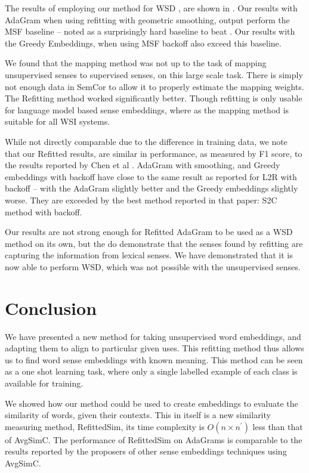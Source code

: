 \documentclass{sig-alternate}
\begin{document}
The results of employing our method for WSD , are shown in . Our results with AdaGram when using refitting with geometric smoothing, output perform the MSF baseline -- noted as a surprisingly hard baseline to beat \parencite{Chen2014}. Our results with the Greedy Embeddings, when using MSF backoff also exceed this baseline.

We found that the mapping method\parencite{agirre2006}  was not up to the task of mapping unsupervised senses to supervised senses, on this large scale task. There is simply not enough data in SemCor to allow it to properly estimate the mapping weights. The Refitting method worked significantly better. Though refitting is only usable for language model based sense embeddings, where as the mapping method is suitable for all WSI systems.

While not directly comparable due to the difference in training data, we note that our Refitted results, are similar in performance, as measured by F1 score, to the results reported by Chen et al \parencite{Chen2014}.
AdaGram with smoothing, and Greedy embeddings with backoff have close to the same result as reported for L2R with backoff -- with the AdaGram slightly better and the Greedy embeddings slightly worse. They are exceeded by the best method reported in that paper: S2C method with backoff.

Our results are not strong enough for Refitted AdaGram to be used as a WSD method on its own, but the do demonstrate that the senses found by refitting are capturing the information from lexical senses. We have demonstrated that it is now able to perform WSD, which was not possible with the unsupervised senses. 

\section{Conclusion}\label{conclusion}

We have presented a new method for taking unsupervised word embeddings, and adapting them to align to particular given uses. This refitting method thus allows us to find word sense embeddings with known meaning. This method can be seen as a one shot learning task, where only a single labelled example of each class is available for training.

We showed how our method could be used to create embeddings to evaluate the similarity of words, given their contexts. This in itself is a new similarity measuring method, RefittedSim, its time complexity is $O(n \times n^\prime)$ less than that of AvgSimC. The performance of RefittedSim on AdaGrams is comparable to the results reported by the proposers of other sense embeddings techniques using AvgSimC.
\end{document}
